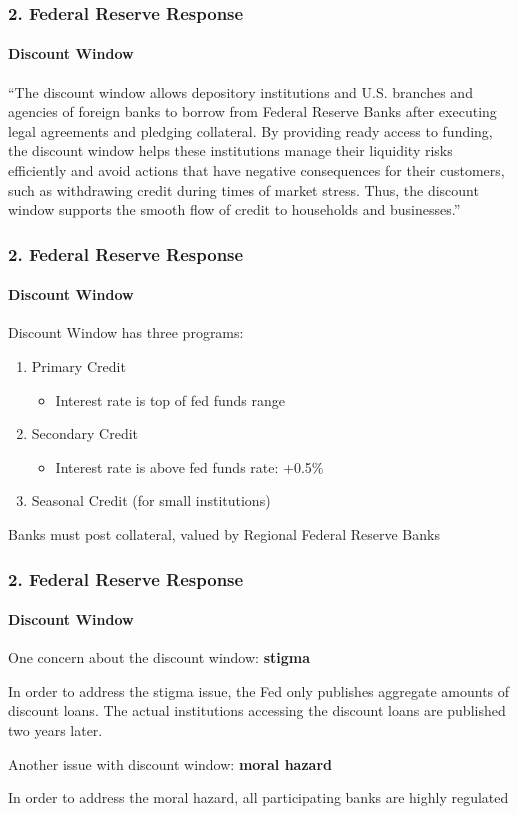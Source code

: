 \documentclass{beamer}
\begin{document}
\begin{frame}[t]
    \frametitle{2. Federal Reserve Response}
    \framesubtitle{Discount Window}
    
    “The discount window allows depository institutions and U.S. branches and agencies of foreign banks to borrow from Federal Reserve Banks after executing legal agreements and pledging collateral.  By providing ready access to funding, the discount window helps these institutions manage their liquidity risks efficiently and avoid actions that have negative consequences for their customers, such as withdrawing credit during times of market stress. Thus, the discount window supports the smooth flow of credit to households and businesses.”  

\end{frame}

\begin{frame}[t]
    \frametitle{2. Federal Reserve Response}
    \framesubtitle{Discount Window}

    Discount Window has three programs:
    \begin{enumerate}
    \item Primary Credit
    \begin{itemize}
    \item Interest rate is top of fed funds range
    \end{itemize}
    \item Secondary Credit
    \begin{itemize}
    \item Interest rate is above fed funds rate: +0.5\%
    \end{itemize}
    \item Seasonal Credit (for small institutions)
    \end{enumerate}
    \vspace{1em}

    Banks must post collateral, valued by Regional Federal Reserve Banks

\end{frame}

\begin{frame}[t]
    \frametitle{2. Federal Reserve Response}
    \framesubtitle{Discount Window}

    One concern about the discount window: \textbf{stigma}
    \vspace{1em}
        
    In order to address the stigma issue, the Fed only publishes aggregate amounts of discount loans.   The actual institutions accessing the discount loans are published two years later.  
    \vspace{1em}
    
    Another issue with discount window: \textbf{moral hazard}
    \vspace{1em}
    
    In order to address the moral hazard, all participating banks are highly regulated

\end{frame}
\end{document}
